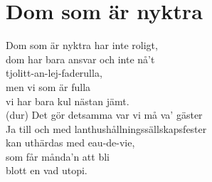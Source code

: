 \section{Dom som är nyktra}
Dom som är nyktra har inte roligt,\\
dom har bara ansvar och inte nå't\\
tjolitt-an-lej-faderulla,\\
men vi som är fulla\\
vi har bara kul nästan jämt.\\

(dur) Det gör detsamma var vi må va' gäster\\
Ja till och med lanthushållningssällskapsfester\\
kan uthärdas med eau-de-vie,\\
som får månda'n att bli\\
blott en vad utopi.\\
